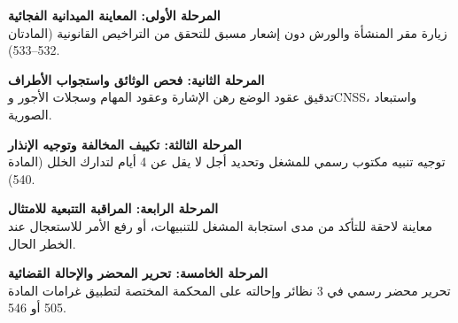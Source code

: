 \vspace{0.8em}
\begin{center}
\begin{minipage}{0.92\textwidth}

\begin{tcolorbox}[colback=lightgray!30, colframe=maincolor, arc=4pt, width=\textwidth, boxrule=1pt, halign=center, valign=center]
\textbf{المرحلة الأولى: المعاينة الميدانية الفجائية}\\[3pt]
\small زيارة مقر المنشأة والورش دون إشعار مسبق للتحقق من التراخيص القانونية (المادتان \textenglish{532}--\textenglish{533}).
\end{tcolorbox}

\centering{\color{maincolor}\Large$\Downarrow$}

\begin{tcolorbox}[colback=lightgray!30, colframe=maincolor, arc=4pt, width=\textwidth, boxrule=1pt, halign=center, valign=center]
\textbf{المرحلة الثانية: فحص الوثائق واستجواب الأطراف}\\[3pt]
\small تدقيق عقود الوضع رهن الإشارة وعقود المهام وسجلات الأجور و\textenglish{CNSS}، واستبعاد الصورية.
\end{tcolorbox}

\centering{\color{maincolor}\Large$\Downarrow$}

\begin{tcolorbox}[colback=lightgray!30, colframe=maincolor, arc=4pt, width=\textwidth, boxrule=1pt, halign=center, valign=center]
\textbf{المرحلة الثالثة: تكييف المخالفة وتوجيه الإنذار}\\[3pt]
\small توجيه تنبيه مكتوب رسمي للمشغل وتحديد أجل لا يقل عن \textenglish{4} أيام لتدارك الخلل (المادة \textenglish{540}).
\end{tcolorbox}

\centering{\color{maincolor}\Large$\Downarrow$}

\begin{tcolorbox}[colback=lightgray!30, colframe=maincolor, arc=4pt, width=\textwidth, boxrule=1pt, halign=center, valign=center]
\textbf{المرحلة الرابعة: المراقبة التتبعية للامتثال}\\[3pt]
\small معاينة لاحقة للتأكد من مدى استجابة المشغل للتنبيهات، أو رفع الأمر للاستعجال عند الخطر الحال.
\end{tcolorbox}

\centering{\color{maincolor}\Large$\Downarrow$}

\begin{tcolorbox}[colback=maincolor!15, colframe=maincolor, arc=4pt, width=\textwidth, boxrule=1.2pt, halign=center, valign=center]
\textbf{المرحلة الخامسة: تحرير المحضر والإحالة القضائية}\\[3pt]
\small تحرير محضر رسمي في \textenglish{3} نظائر وإحالته على المحكمة المختصة لتطبيق غرامات المادة \textenglish{505} أو \textenglish{546}.
\end{tcolorbox}

\vspace{0.8em}
\label{fig:inspection-workflow}

\end{minipage}
\end{center}
